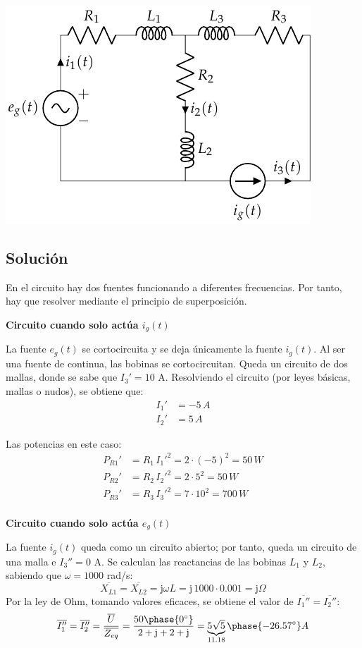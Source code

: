 \begin{center}
  \includegraphics{figuras/BT2_18.pdf}
\end{center}

\subsection*{Solución}

En el circuito hay dos fuentes funcionando a diferentes frecuencias. Por tanto, hay que resolver mediante el principio de superposición.

\textbf{Circuito cuando solo actúa $i_g(t)$}
    
La fuente $e_g(t)$ se cortocircuita y se deja únicamente la fuente
$i_g(t)$. Al ser una fuente de continua, las bobinas se
cortocircuitan. Queda un circuito de dos mallas, donde se sabe que
$I_3'=10$ A. Resolviendo el circuito (por leyes básicas, mallas o
nudos), se obtiene que:
\begin{align*}
  I_1'&=-5\,A\\
  I_2'&=5\,A
\end{align*}
    
Las potencias en este caso:
\begin{align*}
  P_{R1}'&=R_1\,I_1'^2=2\cdot (-5)^2=50\,W\\
  P_{R2}'&=R_2\,I_2'^2=2\cdot 5^2=50\,W\\
  P_{R3}'&=R_3\,I_3'^2=7\cdot 10^2=700\,W\\
\end{align*}
    
\textbf{Circuito cuando solo actúa $e_g(t)$}
    
La fuente $i_g(t)$ queda como un circuito abierto; por tanto, queda un
circuito de una malla e $I_3''=0$ A. Se calculan las reactancias de
las bobinas $L_1$ y $L_2$, sabiendo que $\omega=1000$ rad/s:
\begin{equation*}
  \overline{X_{L1}}=\overline{X_{L2}}=\mathrm{j}\omega L=\mathrm{j}\, 1000\cdot 0.001 = \mathrm{j}\Omega
\end{equation*}
Por la ley de Ohm, tomando valores eficaces, se obtiene el valor de
$\overline{I_1''}=\overline{I_2''}$:
\begin{equation*}
  \overline{I_1''}=\overline{I_2''}=\dfrac{\overline{U}}{\overline{Z_{eq}}}=\dfrac{50\phase{0^\circ}}{2+\mathrm{j}+2+\mathrm{j}}=\underbrace{5\sqrt{5}}_{11.18}\phase{-26.57^\circ} A
\end{equation*}
    
